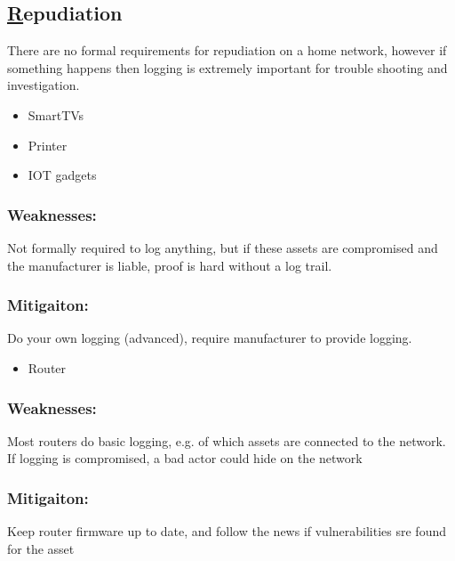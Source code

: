 \documentclass[
	letterpaper, %
	10pt, %
	unnumberedsections, %
	twoside, %
]{APAAssignment}
\begin{document}
\begin{singlespace}
\subsection{\underline{R}epudiation}
There are no formal requirements for repudiation on a home network, however if something happens then logging is extremely important for trouble shooting and investigation.  

	\begin{itemize}
		\item SmartTVs
		\item Printer 
		\item IOT gadgets 
	\end{itemize}
	
	\subsubsection{Weaknesses:} Not formally required to log anything, but if these assets are compromised and the manufacturer is liable, proof is hard without a log trail. 
	\subsubsection{Mitigaiton:} Do your own logging (advanced), require manufacturer to provide logging.
	
	\begin{itemize}
		\item Router
	\end{itemize}
	
	\subsubsection{Weaknesses:} Most routers do basic logging, e.g. of which assets are connected to the network. If logging is compromised, a bad actor could hide on the network
	\subsubsection{Mitigaiton:} Keep router firmware up to date, and follow the news if vulnerabilities sre found for the asset
		
\end{singlespace}
\end{document}
